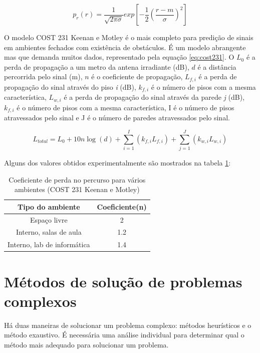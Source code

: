 \documentclass[tc,twoside]{iiufrgs}
\begin{document}
\begin{equation}
{p}_{r}(r) = \frac{1}{\sqrt{2\pi \sigma}}exp\left[-\frac{1}{2} { \left(\frac{r-m}{\sigma}\right)}^{2}\right]
\label{eq:logNormal}
\end{equation}

O modelo COST 231 Keenan e Motley é o mais completo para predição de sinais em ambientes fechados com existência de obstáculos. É um modelo abrangente mas que demanda muitos dados, representado pela equação \ref{eq:cost231}. O ${L}_{0}$ é a perda de propagação a um metro da antena irradiante (dB), $d$ é a distância percorrida pelo sinal (m), $n$ é o coeficiente de propagação, ${L}_{f,i}$ é a perda de propagação do sinal através do piso \textit{i} (dB), ${k}_{f,i}$ é o número de pisos com a mesma característica, ${L}_{w,i}$ é a perda de propagação do sinal através da parede \textit{j} (dB), ${k}_{f,i}$ é o número de pisos com a mesma característica, I é o número de pisos atravessados pelo sinal e J é o número de paredes atravessados pelo sinal. \cite{najnudel2004estudo}

\begin{equation}
{L}_{total} = {L}_{0} + 10 n \log (d) + \sum_{i=1}^{I} ({k}_{f,i} {L}_{f,i}) + \sum_{j=1}^{J} ({k}_{w,i} {L}_{w,i})
\label{eq:cost231}
\end{equation} 

Alguns dos valores obtidos experimentalmente são mostrados na tabela \ref{tbl:coeficienteDistanciaKenMot}:

\begin{table}[ht]
\centering
\caption{Coeficiente de perda no percurso para vários ambientes (COST 231 Keenan e Motley)}
\label{tbl:coeficienteDistanciaKenMot}
\begin{tabular}{cc}
\hline
\textbf{Tipo do ambiente} & \textbf{Coeficiente(n)}\\ 
\hline
 Espaço livre & 2\\
\hline
Interno, salas de aula  & 1.2\\ 
\hline
Interno, lab de informática & 1.4\\
\hline
\end{tabular}
\end{table}

\section{Métodos de solução de problemas complexos}

Há duas maneiras de solucionar um problema complexo: métodos heurísticos e o método exaustivo. É necessária uma análise individual para determinar qual o método mais adequado para solucionar um problema. \cite{junior2008proposta} %
\end{document}
